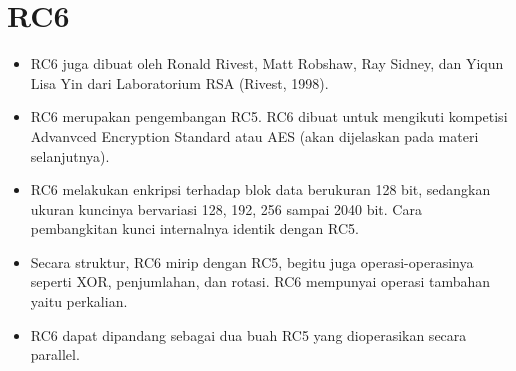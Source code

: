\documentclass{article}
\begin{document}

\section*{RC6}

\begin{itemize}
    \item RC6 juga dibuat oleh Ronald Rivest, Matt Robshaw, Ray Sidney, dan Yiqun Lisa Yin dari Laboratorium RSA (Rivest, 1998).
    \item RC6 merupakan pengembangan RC5. RC6 dibuat untuk mengikuti kompetisi Advanvced Encryption Standard atau AES (akan dijelaskan pada materi selanjutnya).
    \vspace{10mm}
    \item RC6 melakukan enkripsi terhadap blok data berukuran 128 bit, sedangkan ukuran kuncinya bervariasi 128, 192, 256 sampai 2040 bit. Cara pembangkitan kunci internalnya identik dengan RC5.
    \vspace{10mm}
    \item Secara struktur, RC6 mirip dengan RC5, begitu juga operasi-operasinya seperti XOR, penjumlahan, dan rotasi. RC6 mempunyai operasi tambahan yaitu perkalian.
    \item RC6 dapat dipandang sebagai dua buah RC5 yang dioperasikan secara parallel.
\end{itemize}
\end{document}
